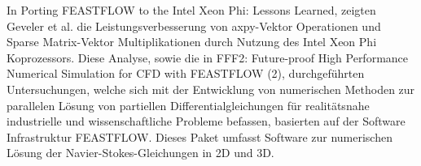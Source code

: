In \glqq Porting FEASTFLOW to the Intel Xeon Phi: Lessons Learned\grqq\cite{VenetisGoumasGevelerRibbrock2015}, zeigten Geveler et al. die Leistungsverbesserung von axpy-Vektor Operationen und Sparse Matrix-Vektor Multiplikationen durch Nutzung des Intel Xeon Phi Koprozessors. Diese Analyse, sowie die in \glqq FFF2: Future-proof High Performance Numerical Simulation for CFD with FEASTFLOW (2)\grqq\cite{GevelerRibbrock2015}, durchgeführten Untersuchungen, welche sich mit der Entwicklung von numerischen Methoden zur parallelen Lösung von partiellen Differentialgleichungen für realitätsnahe industrielle und wissenschaftliche Probleme befassen, basierten auf der Software Infrastruktur \glqq FEASTFLOW\grqq. Dieses Paket umfasst Software zur numerischen Lösung der Navier-Stokes-Gleichungen in 2D und 3D. 
